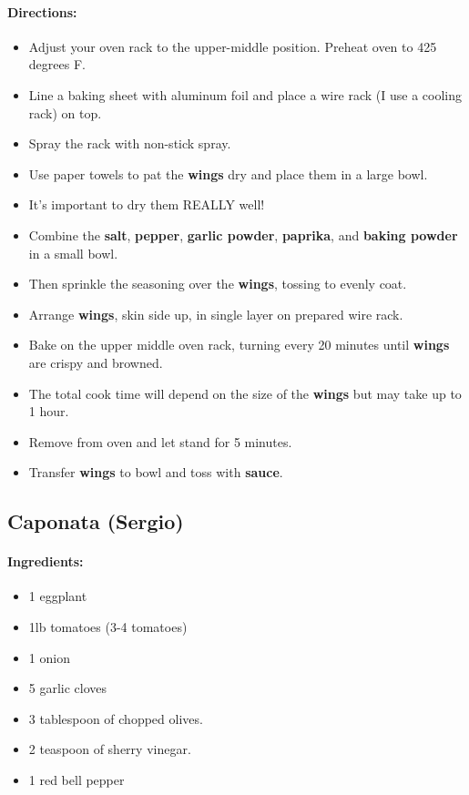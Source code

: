 \documentclass{article}
\begin{document}
\paragraph{Directions:}
\begin{itemize}
    \item Adjust your oven rack to the upper-middle position. Preheat oven to 425 degrees F.
    \item Line a baking sheet with aluminum foil and place a wire rack (I use a cooling rack) on top.
    \item Spray the rack with non-stick spray.
    \item Use paper towels to pat the \textbf{wings} dry and place them in a large bowl.
    \item It's important to dry them REALLY well! 
    \item Combine the \textbf{salt}, \textbf{pepper}, \textbf{garlic powder}, \textbf{paprika}, and \textbf{baking powder} in a small bowl.
    \item Then sprinkle the seasoning over the \textbf{wings}, tossing to evenly coat.
    \item Arrange \textbf{wings}, skin side up, in single layer on prepared wire rack.
    \item Bake on the upper middle oven rack, turning every 20 minutes until \textbf{wings} are crispy and browned.
    \item The total cook time will depend on the size of the \textbf{wings} but may take up to 1 hour.
    \item Remove from oven and let stand for 5 minutes.
    \item Transfer \textbf{wings} to bowl and toss with \textbf{sauce}.
\end{itemize}

\subsection{Caponata (Sergio)}

\paragraph{Ingredients:}
\begin{itemize}
    \item 1 eggplant
    \item 1lb tomatoes (3-4 tomatoes)
    \item 1 onion
    \item 5 garlic cloves
    \item 3 tablespoon of chopped olives.
    \item 2 teaspoon of sherry vinegar.
    \item 1 red bell pepper
\end{itemize}
\end{document}
